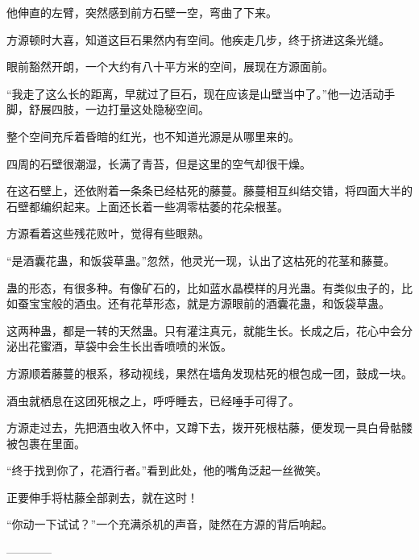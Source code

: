 \begin{this_body}
他伸直的左臂，突然感到前方石壁一空，弯曲了下来。

方源顿时大喜，知道这巨石果然内有空间。他疾走几步，终于挤进这条光缝。

眼前豁然开朗，一个大约有八十平方米的空间，展现在方源面前。

“我走了这么长的距离，早就过了巨石，现在应该是山壁当中了。”他一边活动手脚，舒展四肢，一边打量这处隐秘空间。

整个空间充斥着昏暗的红光，也不知道光源是从哪里来的。

四周的石壁很潮湿，长满了青苔，但是这里的空气却很干燥。

在这石壁上，还依附着一条条已经枯死的藤蔓。藤蔓相互纠结交错，将四面大半的石壁都编织起来。上面还长着一些凋零枯萎的花朵根茎。

方源看着这些残花败叶，觉得有些眼熟。

“是酒囊花蛊，和饭袋草蛊。”忽然，他灵光一现，认出了这枯死的花茎和藤蔓。

蛊的形态，有很多种。有像矿石的，比如蓝水晶模样的月光蛊。有类似虫子的，比如蚕宝宝般的酒虫。还有花草形态，就是方源眼前的酒囊花蛊，和饭袋草蛊。

这两种蛊，都是一转的天然蛊。只有灌注真元，就能生长。长成之后，花心中会分泌出花蜜酒，草袋中会生长出香喷喷的米饭。

方源顺着藤蔓的根系，移动视线，果然在墙角发现枯死的根包成一团，鼓成一块。

酒虫就栖息在这团死根之上，呼呼睡去，已经唾手可得了。

方源走过去，先把酒虫收入怀中，又蹲下去，拨开死根枯藤，便发现一具白骨骷髅被包裹在里面。

“终于找到你了，花酒行者。”看到此处，他的嘴角泛起一丝微笑。

正要伸手将枯藤全部剥去，就在这时！

“你动一下试试？”一个充满杀机的声音，陡然在方源的背后响起。

------------

\end{this_body}

